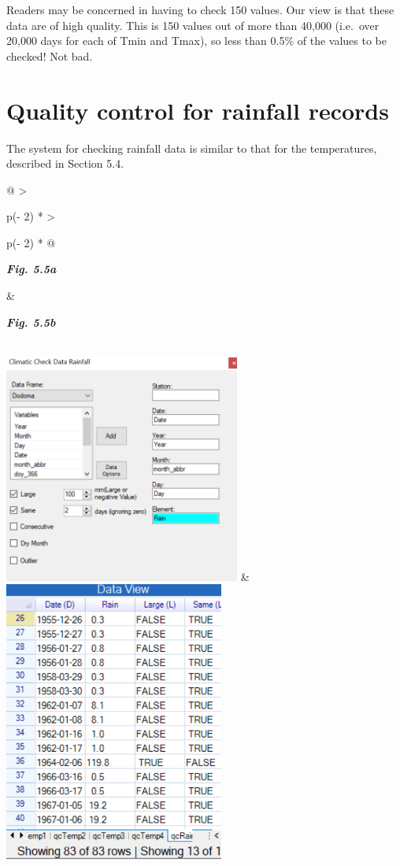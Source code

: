 \documentclass[
  letterpaper,
  DIV=11,
  numbers=noendperiod]{scrreprt}
\begin{document}
Readers may be concerned in having to check 150 values. Our view is that
these data are of high quality. This is 150 values out of more than
40,000 (i.e.~over 20,000 days for each of Tmin and Tmax), so less than
0.5\% of the values to be checked! Not bad.

\section{Quality control for rainfall
records}\label{quality-control-for-rainfall-records}

The system for checking rainfall data is similar to that for the
temperatures, described in Section 5.4.

\begin{longtable}[]{@{}
  >{\raggedright\arraybackslash}p{(\columnwidth - 2\tabcolsep) * }
  >{\raggedright\arraybackslash}p{(\columnwidth - 2\tabcolsep) * }@{}}
\toprule\noalign{}
\begin{minipage}[b]{\linewidth}\raggedright
\textbf{\emph{Fig. 5.5a}}
\end{minipage} & \begin{minipage}[b]{\linewidth}\raggedright
\textbf{\emph{Fig. 5.5b}}
\end{minipage} \\
\midrule\noalign{}
\endhead
\bottomrule\noalign{}
\endlastfoot
\includegraphics[width=3.05307in,height=2.96922in]{figures/Fig5.5a.png}
&
\includegraphics[width=2.84693in,height=3.6388in]{figures/Fig5.5b.png} \\
\end{longtable}
\end{document}
